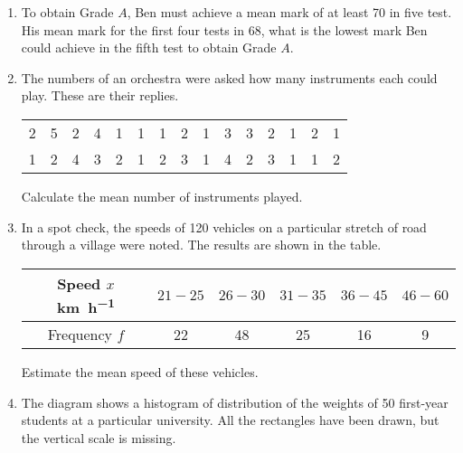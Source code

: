 \begin{enumerate}
	\item To obtain Grade $A$, Ben must achieve a mean mark of at least 70 in five test. His mean mark for the first four tests in 68, 	what is the lowest mark Ben could achieve in the fifth 	test to obtain Grade $A$.
	
	\item The numbers of an orchestra were asked how many instruments each could play. These are their replies.

	\begin{tabular}{ccccccccccccccc}
		\rule[-1ex]{0pt}{2.5ex} 2 & 5 & 2 & 4 & 1 & 1 & 1 & 2 & 1 & 3 & 3 & 2 & 1 & 2 & 1 \\
		\rule[-1ex]{0pt}{2.5ex} 1 & 2 & 4 & 3 & 2 & 1 & 2 & 3 & 1 & 4 & 2 & 3 & 1 & 1 & 2 \\
	\end{tabular}
	
\smallskip
	
	Calculate the mean number of instruments played.
	
	\item In a spot check, the speeds of 120 vehicles on a particular stretch of road through a village were noted. The results are shown in the table.
	\medskip

	
	\begin{tabular}{|c|c|c|c|c|c|}
		\hline
		Speed $x$ \si{\km\per\hour} & $21-25 $  & $26-30$ & $31-35$ & $36-45$ & $46-60$ \\
		\hline
		Frequency $f$ & 22 & 48 & 25 & 16 & 9   \\
		\hline
	\end{tabular}
\medskip

	
	Estimate the mean speed of these vehicles.
	
	\item The diagram shows a histogram of distribution of the weights of 50 first-year students at a particular university. All the rectangles have been drawn, but the vertical scale is missing.

	
	

\end{enumerate}

